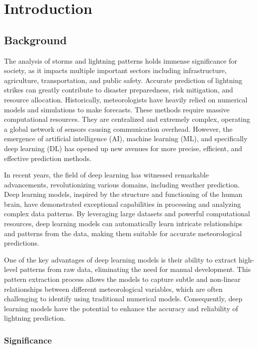 \chapter{Introduction}
\label{sec:introduction}

\section{Background}

The analysis of storms and lightning patterns holds immense significance for society, as it impacts multiple important sectors including infrastructure, agriculture, transportation, and public safety. Accurate prediction of lightning strikes can greatly contribute to disaster preparedness, risk mitigation, and resource allocation. Historically, meteorologists have heavily relied on numerical models and simulations to make forecasts. These methods require massive computational resources. They are centralized and extremely complex, operating a global network of sensors causing communication overhead. However, the emergence of artificial intelligence (AI), machine learning (ML), and specifically deep learning (DL) has opened up new avenues for more precise, efficient, and effective prediction methods.

In recent years, the field of deep learning has witnessed remarkable advancements, revolutionizing various domains, including weather prediction. Deep learning models, inspired by the structure and functioning of the human brain, have demonstrated exceptional capabilities in processing and analyzing complex data patterns. By leveraging large datasets and powerful computational resources, deep learning models can automatically learn intricate relationships and patterns from the data, making them suitable for accurate meteorological predictions.

One of the key advantages of deep learning models is their ability to extract high-level patterns from raw data, eliminating the need for manual development. This pattern extraction process allows the models to capture subtle and non-linear relationships between different meteorological variables, which are often challenging to identify using traditional numerical models. Consequently, deep learning models have the potential to enhance the accuracy and reliability of lightning prediction.

\subsection{Significance}

